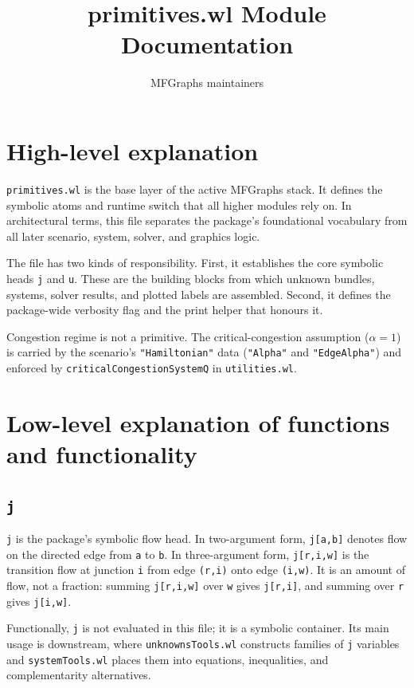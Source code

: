 \documentclass[11pt]{article}
\title{primitives.wl Module Documentation}
\author{MFGraphs maintainers}
\date{}
\begin{document}
\maketitle

\section{High-level explanation}

\texttt{primitives.wl} is the base layer of the active MFGraphs stack. It defines the symbolic atoms and runtime switch that all higher modules rely on. In architectural terms, this file separates the package's foundational vocabulary from all later scenario, system, solver, and graphics logic.

The file has two kinds of responsibility. First, it establishes the core symbolic heads \texttt{j} and \texttt{u}. These are the building blocks from which unknown bundles, systems, solver results, and plotted labels are assembled. Second, it defines the package-wide verbosity flag and the print helper that honours it.

{\sloppy
Congestion regime is not a primitive. The critical-congestion assumption ($\alpha = 1$) is carried by the scenario's \texttt{"Hamiltonian"} data (\texttt{"Alpha"} and \texttt{"EdgeAlpha"}) and enforced by \texttt{criticalCongestionSystemQ} in \texttt{utilities.wl}.\par}

\section{Low-level explanation of functions and functionality}

\subsection*{\texttt{j}}

\texttt{j} is the package's symbolic flow head. In two-argument form, \texttt{j[a,b]} denotes flow on the directed edge from \texttt{a} to \texttt{b}. In three-argument form, \texttt{j[r,i,w]} is the transition flow at junction \texttt{i} from edge \texttt{(r,i)} onto edge \texttt{(i,w)}. It is an amount of flow, not a fraction: summing \texttt{j[r,i,w]} over \texttt{w} gives \texttt{j[r,i]}, and summing over \texttt{r} gives \texttt{j[i,w]}.

Functionally, \texttt{j} is not evaluated in this file; it is a symbolic container. Its main usage is downstream, where \texttt{unknownsTools.wl} constructs families of \texttt{j} variables and \texttt{systemTools.wl} places them into equations, inequalities, and complementarity alternatives.
\end{document}
